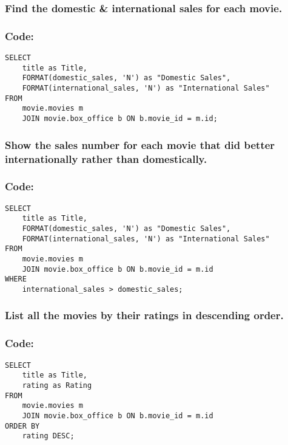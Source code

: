 \documentclass[12pt]{article}
\begin{document}
\vspace{10mm}

\subsubsection{Find the domestic \& international sales for each movie.}
\subsubsection*{Code:}

\begin{verbatim}
SELECT
    title as Title,
    FORMAT(domestic_sales, 'N') as "Domestic Sales",
    FORMAT(international_sales, 'N') as "International Sales"
FROM
    movie.movies m
    JOIN movie.box_office b ON b.movie_id = m.id;
\end{verbatim}

\vspace{5mm}
\subsubsection{Show the sales number for each movie that did better internationally rather than domestically.}
\subsubsection*{Code:}
\begin{verbatim}
SELECT
    title as Title,
    FORMAT(domestic_sales, 'N') as "Domestic Sales",
    FORMAT(international_sales, 'N') as "International Sales"
FROM
    movie.movies m
    JOIN movie.box_office b ON b.movie_id = m.id
WHERE
    international_sales > domestic_sales;
\end{verbatim}

\vspace{5mm}
\subsubsection{List all the movies by their ratings in descending order.}
\subsubsection*{Code:}

\begin{verbatim}
SELECT
    title as Title,
    rating as Rating
FROM
    movie.movies m
    JOIN movie.box_office b ON b.movie_id = m.id
ORDER BY
    rating DESC;
\end{verbatim}
\end{document}

